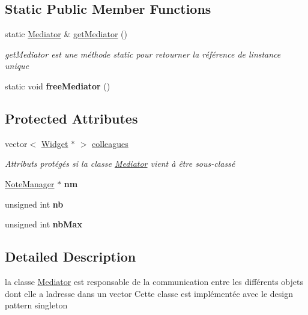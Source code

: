 \subsection*{Static Public Member Functions}
\begin{DoxyCompactItemize}
\item 
static \hyperlink{classMediator}{Mediator} \& \hyperlink{classMediator_a4f9ee710da1df5348e19a54ce4396952}{get\+Mediator} ()
\begin{DoxyCompactList}\small\item\em get\+Mediator est une méthode static pour retourner la référence de l\textquotesingle{}instance unique \end{DoxyCompactList}\item 
\mbox{\label{classMediator_a44737f7a290891afafa9f94832d1895c}} 
static void {\bfseries free\+Mediator} ()
\end{DoxyCompactItemize}
\subsection*{Protected Attributes}
\begin{DoxyCompactItemize}
\item 
\mbox{\label{classMediator_a0b7efbede213b7a9ac81e25bdda7f943}} 
vector$<$ \hyperlink{classWidget}{Widget} $\ast$ $>$ \hyperlink{classMediator_a0b7efbede213b7a9ac81e25bdda7f943}{colleagues}
\begin{DoxyCompactList}\small\item\em Attributs protégés si la classe \hyperlink{classMediator}{Mediator} vient à être sous-\/classé \end{DoxyCompactList}\item 
\mbox{\label{classMediator_aff24a86b4a88e6c4da795216c72ad89a}} 
\hyperlink{classNoteManager}{Note\+Manager} $\ast$ {\bfseries nm}
\item 
\mbox{\label{classMediator_a1165c6f9067f39254a76dbca31f7f35a}} 
unsigned int {\bfseries nb}
\item 
\mbox{\label{classMediator_a0f0f1c89941f4a9eee97d39a374683cc}} 
unsigned int {\bfseries nb\+Max}
\end{DoxyCompactItemize}


\subsection{Detailed Description}
la classe \hyperlink{classMediator}{Mediator} est responsable de la communication entre les différents objets dont elle a l\textquotesingle{}adresse dans un vector Cette classe est implémentée avec le design pattern singleton 

